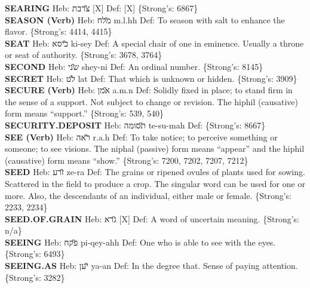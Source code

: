 {\textbf{SEARING} Heb: {\large\H צרבת} {[}X{]} Def: {[}X{]} \{Strong's: 6867\}\hfill{}\\

\textbf{SEASON (Verb)} Heb: {\large\H מלח} m.l.hh Def: To season with salt to enhance the flavor. \{Strong's: 4414, 4415\}\hfill{}\\

\textbf{SEAT} Heb: {\large\H כיסא} ki-sey Def: A special chair of one in eminence. Usually a throne or seat of authority. \{Strong's: 3678, 3764\}\hfill{}\\

\textbf{SECOND} Heb: {\large\H שני} shey-ni Def: An ordinal number. \{Strong's: 8145\}\hfill{}\\

\textbf{SECRET} Heb: {\large\H לט} lat Def: That which is unknown or hidden. \{Strong's: 3909\}\hfill{}\\

\textbf{SECURE (Verb)} Heb: {\large\H אמן} a.m.n Def: Solidly fixed in place; to stand firm in the sense of a support. Not subject to change or revision. The hiphil (causative) form means ``support.'' \{Strong's: 539, 540\}\hfill{}\\

\textbf{SECURITY.DEPOSIT} Heb: {\large\H תסומה} te-su-mah Def: \{Strong's: 8667\}\hfill{}\\

\textbf{SEE (Verb)} Heb: {\large\H ראה} r.a.h Def: To take notice; to perceive something or someone; to see visions. The niphal (passive) form means ``appear'' and the hiphil (causative) form means ``show.'' \{Strong's: 7200, 7202, 7207, 7212\}\hfill{}\\

\textbf{SEED} Heb: {\large\H זרע} ze-ra Def: The grains or ripened ovules of plants used for sowing. Scattered in the field to produce a crop. The singular word can be used for one or more. Also, the descendants of an individual, either male or female. \{Strong's: 2233, 2234\}\hfill{}\\

\textbf{SEED.OF.GRAIN} Heb: {\large\H גרא} {[}X{]} Def: A word of uncertain meaning. \{Strong's: n/a\}\hfill{}\\

\textbf{SEEING} Heb: {\large\H פקח} pi-qey-ahh Def: One who is able to see with the eyes. \{Strong's: 6493\}\hfill{}\\

\textbf{SEEING.AS} Heb: {\large\H יען} ya-an Def: In the degree that. Sense of paying attention. \{Strong's: 3282\}\hfill{}\\

}
